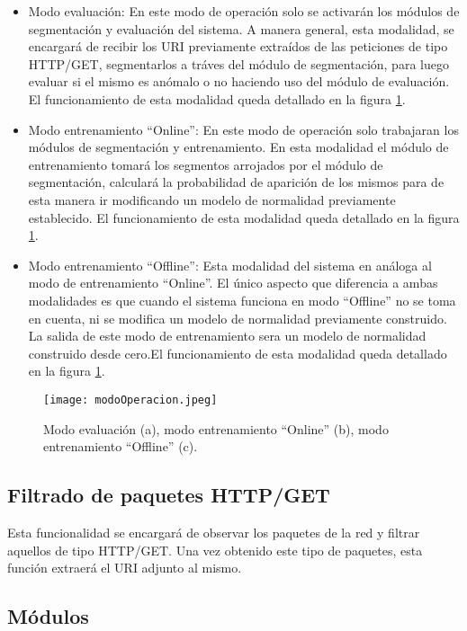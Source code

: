 \begin{itemize}
\item Modo evaluación: En este modo de operación solo se activarán los módulos de segmentación y evaluación del sistema. A manera general, esta modalidad, se encargará de recibir los URI previamente extraídos de las peticiones de tipo HTTP/GET, segmentarlos a tráves del módulo de segmentación, para luego evaluar si el mismo es anómalo o no
haciendo uso del módulo de evaluación. El funcionamiento de esta modalidad queda detallado en la figura \ref{fig:modoSistema}.
\item Modo entrenamiento ``Online'': En este modo de operación solo trabajaran los módulos de segmentación y entrenamiento. En esta modalidad el módulo de entrenamiento tomará los segmentos arrojados por el módulo de segmentación, calculará la probabilidad de aparición de los mismos para de esta manera ir modificando un modelo de normalidad previamente establecido. El funcionamiento de esta modalidad queda
detallado en la figura \ref{fig:modoSistema}.
\item Modo entrenamiento ``Offline'': Esta modalidad del sistema en análoga al modo de entrenamiento ``Online''. El único aspecto que diferencia a ambas modalidades es que cuando el sistema funciona en modo ``Offline'' no se toma en cuenta, ni se modifica un modelo de normalidad previamente construido. La salida de este modo de entrenamiento sera un modelo de normalidad construido desde cero.El funcionamiento de esta modalidad queda detallado en la figura \ref{fig:modoSistema}.
\end{itemize}

\begin{figure}[tb]
\begin{center}
\texttt{[image: modoOperacion.jpeg]}
\caption{Modo evaluación (a), modo entrenamiento ``Online'' (b), modo entrenamiento ``Offline'' (c).}
\label{fig:modoSistema}
\end{center}
\end{figure}


\subsection{Filtrado de paquetes HTTP/GET}

Esta funcionalidad se encargará de observar los paquetes de la red y filtrar aquellos de tipo HTTP/GET. Una vez obtenido este tipo de paquetes, esta función extraerá el URI adjunto al mismo.

\subsection{Módulos}


